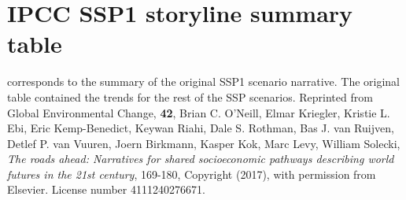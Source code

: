 \clearpage
\chapter{IPCC SSP1 storyline summary table}
\label{a:ssp1-summary-table}
%
 corresponds to the summary of the original SSP1 scenario narrative. The original table contained the trends for the rest of the SSP scenarios. Reprinted from Global Environmental Change, \textbf{42}, Brian C. O’Neill, Elmar Kriegler, Kristie L. Ebi, Eric Kemp-Benedict, Keywan Riahi, Dale S. Rothman, Bas J. van Ruijven, Detlef P. van Vuuren, Joern Birkmann, Kasper Kok, Marc
Levy, William Solecki, \textit{The roads ahead: Narratives for shared socioeconomic pathways describing world futures in the 21st century}, 169-180, Copyright (2017), with permission from Elsevier. License number 4111240276671.

